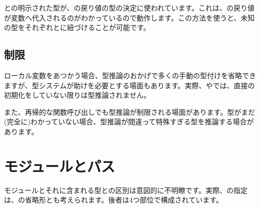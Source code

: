 
との明示された型が、の戻り値の型の決定に使われています。これは、の戻り値が変数へ代入されるのがわかっているので動作します。この方法を使うと、未知の型をそれぞれとに紐づけることが可能です。





\subsection{制限}
\label{type-system-inference-limitations}

ローカル変数をあつかう場合、型推論のおかげで多くの手動の型付けを省略できますが、型システムが助けを必要とする場面もあります。実際、やでは、直接の初期化をしていない限りは型推論されません。

また、再帰的な関数呼び出しでも型推論が制限される場面があります。型がまだ(完全に)わかっていない場合、型推論が間違って特殊すぎる型を推論する場合があります。

\section{モジュールとパス}
\label{type-system-modules-and-paths}


モジュールとそれに含まれる型との区別は意図的に不明瞭です。実際、の指定は、の省略形とも考えられます。後者は4つ部位で構成されています。

